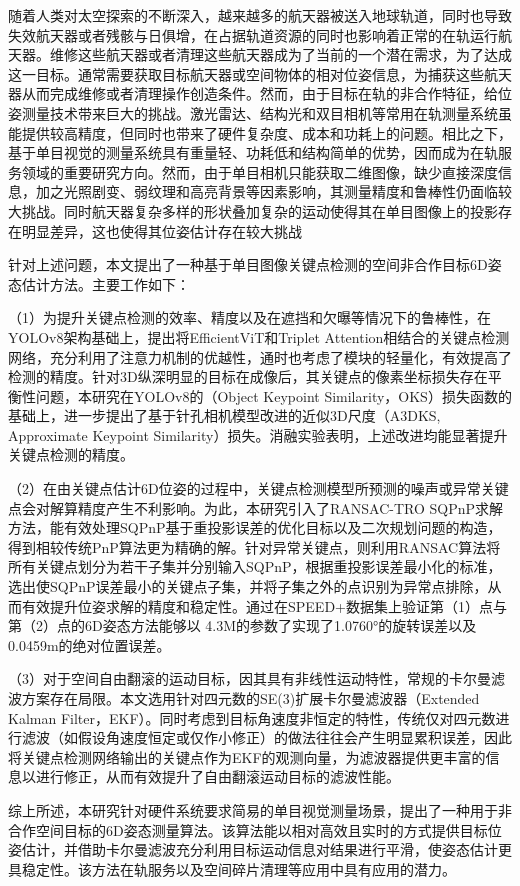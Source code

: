 随着人类对太空探索的不断深入，越来越多的航天器被送入地球轨道，同时也导致失效航天器或者残骸与日俱增，在占据轨道资源的同时也影响着正常的在轨运行航天器。维修这些航天器或者清理这些航天器成为了当前的一个潜在需求，为了达成这一目标。通常需要获取目标航天器或空间物体的相对位姿信息，为捕获这些航天器从而完成维修或者清理操作创造条件。然而，由于目标在轨的非合作特征，给位姿测量技术带来巨大的挑战。激光雷达、结构光和双目相机等常用在轨测量系统虽能提供较高精度，但同时也带来了硬件复杂度、成本和功耗上的问题。相比之下，基于单目视觉的测量系统具有重量轻、功耗低和结构简单的优势，因而成为在轨服务领域的重要研究方向。然而，由于单目相机只能获取二维图像，缺少直接深度信息，加之光照剧变、弱纹理和高亮背景等因素影响，其测量精度和鲁棒性仍面临较大挑战。同时航天器复杂多样的形状叠加复杂的运动使得其在单目图像上的投影存在明显差异，这也使得其位姿估计存在较大挑战

针对上述问题，本文提出了一种基于单目图像关键点检测的空间非合作目标6D姿态估计方法。主要工作如下：

	
（1）为提升关键点检测的效率、精度以及在遮挡和欠曝等情况下的鲁棒性，在YOLOv8架构基础上，提出将EfficientViT和Triplet Attention相结合的关键点检测网络，充分利用了注意力机制的优越性，通时也考虑了模块的轻量化，有效提高了检测的精度。针对3D纵深明显的目标在成像后，其关键点的像素坐标损失存在平衡性问题，本研究在YOLOv8的（Object Keypoint Similarity，OKS）损失函数的基础上，进一步提出了基于针孔相机模型改进的近似3D尺度（A3DKS, Approximate Keypoint Similarity）损失。消融实验表明，上述改进均能显著提升关键点检测的精度。

（2）在由关键点估计6D位姿的过程中，关键点检测模型所预测的噪声或异常关键点会对解算精度产生不利影响。为此，本研究引入了RANSAC-TRO SQPnP求解方法，能有效处理SQPnP基于重投影误差的优化目标以及二次规划问题的构造，得到相较传统PnP算法更为精确的解。针对异常关键点，则利用RANSAC算法将所有关键点划分为若干子集并分别输入SQPnP，根据重投影误差最小化的标准，选出使SQPnP误差最小的关键点子集，并将子集之外的点识别为异常点排除，从而有效提升位姿求解的精度和稳定性。通过在SPEED+数据集上验证第（1）点与第（2）点的6D姿态方法能够以	4.3M的参数了实现了1.0760°的旋转误差以及0.0459m的绝对位置误差。

（3）对于空间自由翻滚的运动目标，因其具有非线性运动特性，常规的卡尔曼滤波方案存在局限。本文选用针对四元数的SE(3)扩展卡尔曼滤波器（Extended Kalman Filter，EKF）。同时考虑到目标角速度非恒定的特性，传统仅对四元数进行滤波（如假设角速度恒定或仅作小修正）的做法往往会产生明显累积误差，因此将关键点检测网络输出的关键点作为EKF的观测向量，为滤波器提供更丰富的信息以进行修正，从而有效提升了自由翻滚运动目标的滤波性能。

综上所述，本研究针对硬件系统要求简易的单目视觉测量场景，提出了一种用于非合作空间目标的6D姿态测量算法。该算法能以相对高效且实时的方式提供目标位姿估计，并借助卡尔曼滤波充分利用目标运动信息对结果进行平滑，使姿态估计更具稳定性。该方法在轨服务以及空间碎片清理等应用中具有应用的潜力。
